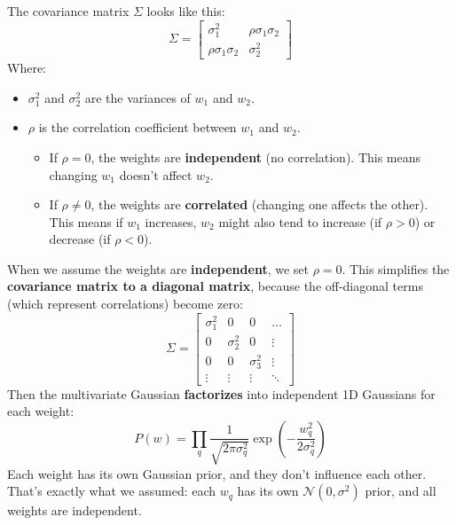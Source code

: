 \begin{deepeningbox}
    \highspace
    The covariance matrix $\Sigma$ looks like this:
    \begin{equation*}
        \Sigma = \begin{bmatrix} \sigma_1^2 & \rho \sigma_1 \sigma_2 \\ \rho \sigma_1 \sigma_2 & \sigma_2^2 \end{bmatrix}
    \end{equation*}
    Where:
    \begin{itemize}
        \item $\sigma_1^2$ and $\sigma_2^2$ are the variances of $w_1$ and $w_2$.
        \item $\rho$ is the correlation coefficient between $w_1$ and $w_2$.
        \begin{itemize}
            \item If $\rho = 0$, the weights are \textbf{independent} (no correlation). This means changing $w_1$ doesn't affect $w_2$.
            \item If $\rho \neq 0$, the weights are \textbf{correlated} (changing one affects the other). This means if $w_1$ increases, $w_2$ might also tend to increase (if $\rho > 0$) or decrease (if $\rho < 0$).
        \end{itemize}
    \end{itemize}
    When we assume the weights are \textbf{independent}, we set $\rho = 0$. This simplifies the \textbf{covariance matrix to a diagonal matrix}, because the off-diagonal terms (which represent correlations) become zero:
    \begin{equation*}
        \Sigma = \begin{bmatrix} \sigma_1^2 & 0 & 0 & \dots \\ 0 & \sigma_2^2 & 0 & \vdots \\ 0 & 0 & \sigma_3^2 & \vdots \\ \vdots & \vdots & \vdots & \ddots \end{bmatrix}
    \end{equation*}
    Then the multivariate Gaussian \textbf{factorizes} into independent 1D Gaussians for each weight:
    \begin{equation*}
        P\left(w\right) = \prod_{q} \dfrac{1}{\sqrt{2 \pi \sigma_q^2}} \exp\left(-\dfrac{w_q^2}{2 \sigma_q^2}\right)
    \end{equation*}
    Each weight has its own Gaussian prior, and they don't influence each other. That's exactly what we assumed: each $w_q$ has its own $\mathcal{N}\left(0, \sigma^{2}\right)$ prior, and all weights are independent.


\end{deepeningbox}
